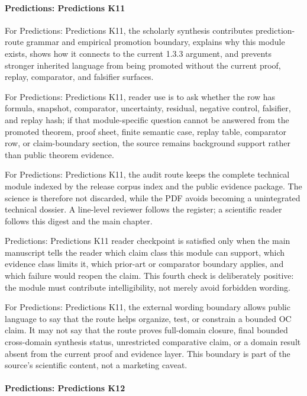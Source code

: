 \paragraph{Predictions: Predictions K11}

For Predictions: Predictions K11, the scholarly synthesis contributes prediction-route grammar and empirical promotion boundary, explains why this module exists, shows how it connects to the current 1.3.3 argument, and prevents stronger inherited language from being promoted without the current proof, replay, comparator, and falsifier surfaces.


For Predictions: Predictions K11, reader use is to ask whether the row has formula, snapshot, comparator, uncertainty, residual, negative control, falsifier, and replay hash; if that module-specific question cannot be answered from the promoted theorem, proof sheet, finite semantic case, replay table, comparator row, or claim-boundary section, the source remains background support rather than public theorem evidence.


For Predictions: Predictions K11, the audit route keeps the complete technical module indexed by the release corpus index and the public evidence package. The science is therefore not discarded, while the PDF avoids becoming a unintegrated technical dossier. A line-level reviewer follows the register; a scientific reader follows this digest and the main chapter.


Predictions: Predictions K11 reader checkpoint is satisfied only when the main manuscript tells the reader which claim class this module can support, which evidence class limits it, which prior-art or comparator boundary applies, and which failure would reopen the claim. This fourth check is deliberately positive: the module must contribute intelligibility, not merely avoid forbidden wording.


For Predictions: Predictions K11, the external wording boundary allows public language to say that the route helps organize, test, or constrain a bounded OC claim. It may not say that the route proves full-domain closure, final bounded cross-domain synthesis status, unrestricted comparative claim, or a domain result absent from the current proof and evidence layer. This boundary is part of the source's scientific content, not a marketing caveat.


\paragraph{Predictions: Predictions K12}

